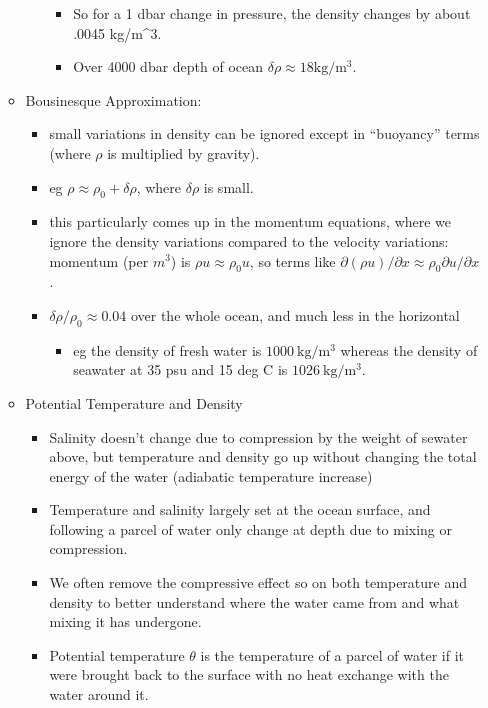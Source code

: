\begin{itemize}
\begin{itemize}
\begin{itemize}
      \begin{itemize}
      \tightlist
      \item
        So for a 1 dbar change in pressure, the density changes by about
        .0045 kg/m\^{}3.
      \item
        Over 4000 dbar depth of ocean
        \(\delta \rho \approx 18 \mathrm{kg/m^3}\).
      \end{itemize}
    \end{itemize}
  \item
    Bousinesque Approximation:

    \begin{itemize}
    \tightlist
    \item
      small variations in density can be ignored except in ``buoyancy''
      terms (where \(\rho\) is multiplied by gravity).
    \item
      eg \(\rho \approx \rho_0 + \delta\rho\), where \(\delta\rho\) is
      small.
    \item
      this particularly comes up in the momentum equations, where we
      ignore the density variations compared to the velocity variations:
      momentum (per \(m^3\)) is \(\rho u \approx \rho_0 u\), so terms
      like
      \(\partial (\rho u)/\partial x \approx \rho_0 \partial u/\partial x\).
    \item
      \(\delta\rho/\rho_0 \approx 0.04\) over the whole ocean, and much
      less in the horizontal

      \begin{itemize}
      \tightlist
      \item
        eg the density of fresh water is \(1000\ \mathrm{kg/m^3}\)
        whereas the density of seawater at 35 psu and 15 deg C is
        \(1026\ \mathrm{kg/m^3}\).
      \end{itemize}
    \end{itemize}
  \item
    Potential Temperature and Density

    \begin{itemize}
    \tightlist
    \item
      Salinity doesn't change due to compression by the weight of
      sewater above, but temperature and density go up without changing
      the total energy of the water (adiabatic temperature increase)
    \item
      Temperature and salinity largely set at the ocean surface, and
      following a parcel of water only change at depth due to mixing or
      compression.
    \item
      We often remove the compressive effect so on both temperature and
      density to better understand where the water came from and what
      mixing it has undergone.
    \item
      Potential temperature \(\theta\) is the temperature of a parcel of
      water if it were brought back to the surface with no heat exchange
      with the water around it.


\end{itemize}
\end{itemize}
\end{itemize}
